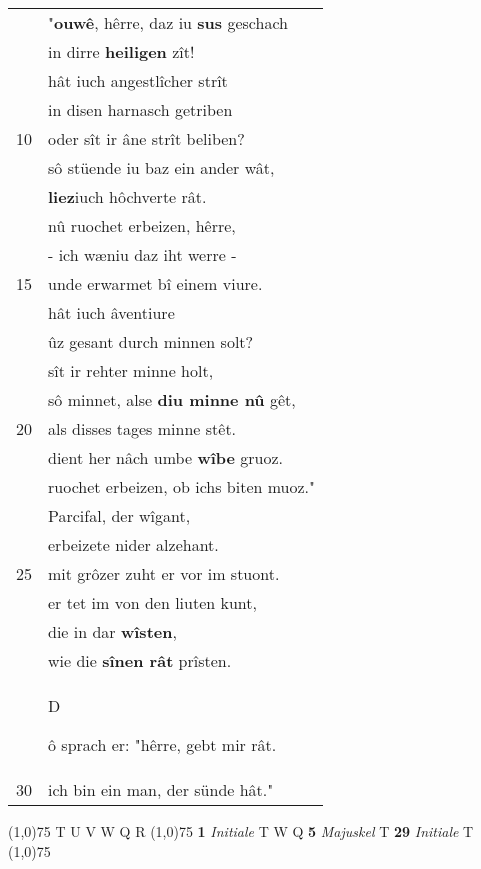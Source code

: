 \documentclass[8pt,a4paper,notitlepage]{article}
\begin{document}
\begin{table}[ht]
\begin{minipage}[t]{0.5\linewidth}
\begin{tabular}{rl}
 & "\textbf{ouwê}, hêrre, daz iu \textbf{sus} geschach\\ 
 & in dirre \textbf{heiligen} zît!\\ 
 & hât iuch angestlîcher strît\\ 
 & in disen harnasch getriben\\ 
10 & oder sît ir âne strît beliben?\\ 
 & sô stüende iu baz ein ander wât,\\ 
 & \textbf{liez}iuch hôchverte rât.\\ 
 & nû ruochet erbeizen, hêrre,\\ 
 & - ich wæniu daz iht werre -\\ 
15 & unde erwarmet bî einem viure.\\ 
 & hât iuch âventiure\\ 
 & ûz gesant durch minnen solt?\\ 
 & sît ir rehter minne holt,\\ 
 & sô minnet, alse \textbf{diu minne nû} gêt,\\ 
20 & als disses tages minne stêt.\\ 
 & dient her nâch umbe \textbf{wîbe} gruoz.\\ 
 & ruochet erbeizen, ob ichs biten muoz."\\ 
 & Parcifal, der wîgant,\\ 
 & erbeizete nider alzehant.\\ 
25 & mit grôzer zuht er vor im stuont.\\ 
 & er tet im von den liuten kunt,\\ 
 & die in dar \textbf{wîsten},\\ 
 & wie die \textbf{sînen rât} prîsten.\\ 
 & \begin{large}D\end{large}ô sprach er: "hêrre, gebt mir rât.\\ 
30 & ich bin ein man, der sünde hât."\\ 
\end{tabular}
\scriptsize
\line(1,0){75} \newline
T U V W Q R \newline
\line(1,0){75} \newline
\textbf{1} \textit{Initiale} T W Q  \textbf{5} \textit{Majuskel} T  \textbf{29} \textit{Initiale} T  \newline
\line(1,0){75} \newline

\end{minipage}
\end{table}
\end{document}
